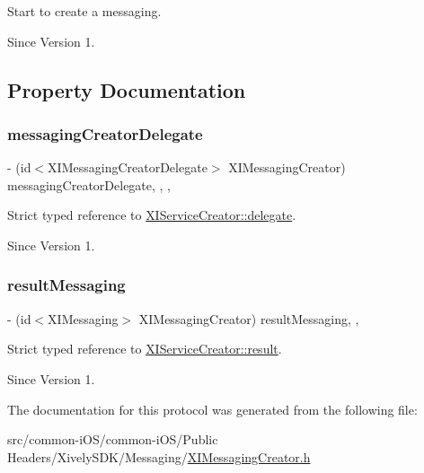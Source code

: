 Start to create a messaging. 

\begin{DoxySince}{Since}
Version 1. 
\end{DoxySince}


\subsection{Property Documentation}
\hypertarget{protocol_x_i_messaging_creator_01-p_a75e60b04ff2a8900116fe2b3e60485b7}{}\label{protocol_x_i_messaging_creator_01-p_a75e60b04ff2a8900116fe2b3e60485b7} 
\subsubsection{\texorpdfstring{messaging\+Creator\+Delegate}{messagingCreatorDelegate}}
{\footnotesize\ttfamily -\/ (id$<$X\+I\+Messaging\+Creator\+Delegate$>$ X\+I\+Messaging\+Creator) messaging\+Creator\+Delegate\hspace{0.3cm}{\ttfamily [read]}, {\ttfamily [write]}, {\ttfamily [nonatomic]}, {\ttfamily [weak]}}



Strict typed reference to \hyperlink{}{X\+I\+Service\+Creator\+::delegate}. 

\begin{DoxySince}{Since}
Version 1. 
\end{DoxySince}
\hypertarget{protocol_x_i_messaging_creator_01-p_a056b33d12a0b3042e89b5cd5fc83250d}{}\label{protocol_x_i_messaging_creator_01-p_a056b33d12a0b3042e89b5cd5fc83250d} 
\subsubsection{\texorpdfstring{result\+Messaging}{resultMessaging}}
{\footnotesize\ttfamily -\/ (id$<$X\+I\+Messaging$>$ X\+I\+Messaging\+Creator) result\+Messaging\hspace{0.3cm}{\ttfamily [read]}, {\ttfamily [nonatomic]}, {\ttfamily [assign]}}



Strict typed reference to \hyperlink{}{X\+I\+Service\+Creator\+::result}. 

\begin{DoxySince}{Since}
Version 1. 
\end{DoxySince}


The documentation for this protocol was generated from the following file\+:\begin{DoxyCompactItemize}
\item 
src/common-\/i\+O\+S/common-\/i\+O\+S/\+Public Headers/\+Xively\+S\+D\+K/\+Messaging/\hyperlink{_x_i_messaging_creator_8h}{X\+I\+Messaging\+Creator.\+h}\end{DoxyCompactItemize}
